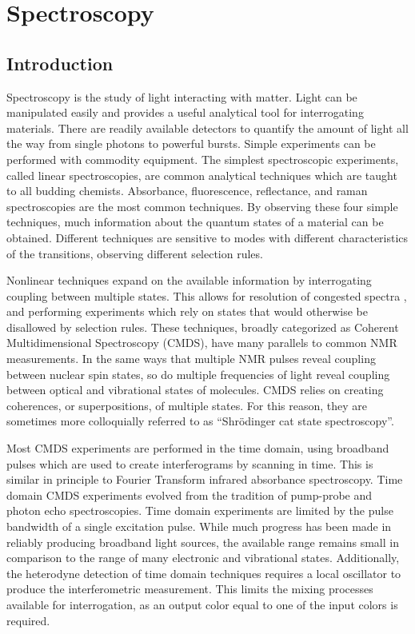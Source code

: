 \chapter{Spectroscopy} \label{cha:spec}

\clearpage

\section{Introduction}  %

Spectroscopy is the study of light interacting with matter.
Light can be manipulated easily and provides a useful analytical tool for interrogating materials.
There are readily available detectors to quantify the amount of light all the way from single photons to powerful bursts.
Simple experiments can be performed with commodity equipment.
The simplest spectroscopic experiments, called linear spectroscopies, are common analytical techniques which are taught to all budding chemists.
Absorbance, fluorescence, reflectance, and raman spectroscopies are the most common techniques.
By observing these four simple techniques, much information about the quantum states of a material can be obtained.
Different techniques are sensitive to modes with different characteristics of the transitions, observing different selection rules.

Nonlinear techniques expand on the available information by interrogating coupling between multiple states.
This allows for resolution of congested spectra \cite{},  and performing experiments which rely on states that would otherwise be disallowed by selection rules\cite{}.
These techniques, broadly categorized as Coherent Multidimensional Spectroscopy (CMDS), have many parallels to common NMR measurements\cite{}.
In the same ways that multiple NMR pulses reveal coupling between nuclear spin states, so do multiple frequencies of light reveal coupling between optical and vibrational states of molecules.
CMDS relies on creating coherences, or superpositions, of multiple states.
For this reason, they are sometimes more colloquially referred to as ``Shr\"odinger cat state spectroscopy''\cite{}.

Most CMDS experiments are performed in the time domain, using broadband pulses which are used to create interferograms by scanning in time\cite{}.
This is similar in principle to Fourier Transform infrared absorbance spectroscopy.
Time domain CMDS experiments evolved from the tradition of pump-probe and photon echo spectroscopies\cite{}.
Time domain experiments are limited by the pulse bandwidth of a single excitation pulse\cite{}.
While much progress has been made in reliably producing broadband light sources\cite{}, the available range remains small in comparison to the range of many electronic and vibrational states.
Additionally, the heterodyne detection of time domain techniques requires a local oscillator to produce the interferometric measurement.
This limits the mixing processes available for interrogation, as an output color equal to one of the input colors is required.

